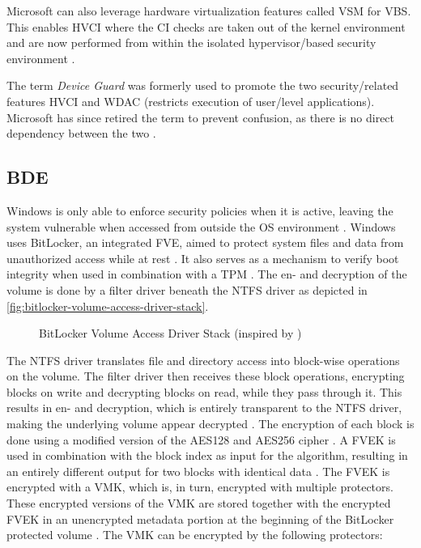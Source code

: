Microsoft can also leverage hardware virtualization features called \ac{VSM} for \ac{VBS}.
This enables \ac{HVCI} where the \ac{CI} checks are taken out of the kernel environment and are now performed from within the isolated hypervisor\-/based security environment \cite{micosoft-windows-oem-vbs}.

The term \emph{Device Guard} was formerly used to promote the two security\-/related features \ac{HVCI} and \ac{WDAC} (restricts execution of user\-/level applications).
Microsoft has since retired the term to prevent confusion, as there is no direct dependency between the two \cite{microsoft-windows-no-longer-device-guard}.

\subsection{\acf{BDE}}
\label{sec:windows:security:bde}

Windows is only able to enforce security policies when it is active, leaving the system vulnerable when accessed from outside the \ac{OS} environment \cite[Section 9]{windows-internals-6-part2}.
Windows uses BitLocker, an integrated \ac{FVE}, aimed to protect system files and data from unauthorized access while at rest \cite{microsoft-bitlocker-overview}.
It also serves as a mechanism to verify boot integrity when used in combination with a \ac{TPM} \cite[Section 9]{windows-internals-6-part2}.
The en- and decryption of the volume is done by a filter driver beneath the \ac{NTFS} driver as depicted in \autoref{fig:bitlocker-volume-access-driver-stack}.

\begin{figure}[htb]%
    \centering
    
    \caption[BitLocker Volume Access Driver Stack]{BitLocker Volume Access Driver Stack (inspired by \cite[Figure 9-24]{windows-internals-6-part2})}%
    \label{fig:bitlocker-volume-access-driver-stack}%
\end{figure}

The \ac{NTFS} driver translates file and directory access into block-wise operations on the volume.
The filter driver then receives these block operations, encrypting blocks on write and decrypting blocks on read, while they pass through it.
This results in en- and decryption, which is entirely transparent to the \ac{NTFS} driver, making the underlying volume appear decrypted \cite[Section 9]{windows-internals-6-part2}.
The encryption of each block is done using a modified version of the \ac{AES}128 and \ac{AES}256 cipher \cite[Section 9]{windows-internals-6-part2}.
A \ac{FVEK} is used in combination with the block index as input for the algorithm, resulting in an entirely different output for two blocks with identical data \cite[Section 9]{windows-internals-6-part2}.
The \ac{FVEK} is encrypted with a \ac{VMK}, which is, in turn, encrypted with multiple protectors.
These encrypted versions of the \ac{VMK} are stored together with the encrypted \ac{FVEK} in an unencrypted metadata portion at the beginning of the BitLocker protected volume \cite[Section 9]{windows-internals-6-part2}.
The \ac{VMK} can be encrypted by the following protectors:

